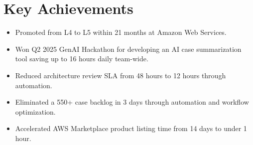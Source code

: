 \documentclass[11pt,a4paper]{article}
\begin{document}
\section{Key Achievements}
\begin{itemize}
  \item Promoted from L4 to L5 within 21 months at Amazon Web Services.
  \item Won Q2 2025 GenAI Hackathon for developing an AI case summarization tool saving up to 16 hours daily team-wide.
  \item Reduced architecture review SLA from 48 hours to 12 hours through automation.
  \item Eliminated a 550+ case backlog in 3 days through automation and workflow optimization.
  \item Accelerated AWS Marketplace product listing time from 14 days to under 1 hour.
\end{itemize}
\end{document}
